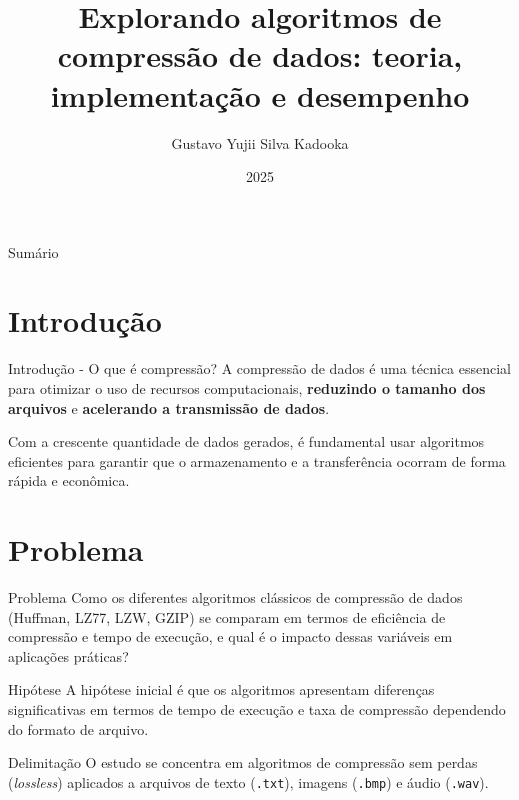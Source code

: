 \documentclass{beamer}
\title[Proposta de TCC]{Explorando algoritmos de compressão de dados: teoria, implementação e desempenho}
\author[Gustavo Kadooka]{Gustavo Yujii Silva Kadooka}
\institute[UNESP]{Universidade Estadual Paulista - Câmpus Bauru}
\date{2025}
\begin{document}
    \begin{frame}
        \titlepage  
    \end{frame}
    
    \begin{frame}{Sumário}
        \tableofcontents
    \end{frame}

    \section{Introdução}

    \begin{frame}{Introdução - O que é compressão?}
        A compressão de dados é uma técnica essencial para otimizar o uso de recursos computacionais, \textbf{reduzindo
            o tamanho dos arquivos} e \textbf{acelerando a transmissão de dados}. 

        Com a crescente quantidade de dados gerados, é fundamental usar algoritmos eficientes para garantir que o armazenamento e a transferência ocorram de forma rápida e econômica.
    \end{frame}

    \section{Problema}
    \begin{frame}{Problema} 
        Como os diferentes algoritmos clássicos de compressão de dados (Huffman, LZ77, LZW, GZIP) se comparam em termos de eficiência de compressão e tempo de execução, e qual é o impacto dessas variáveis em aplicações práticas?
        
        \begin{block}{Hipótese}
            A hipótese inicial é que os algoritmos apresentam diferenças significativas em termos de tempo de execução e
            taxa de compressão dependendo do formato de arquivo.
        \end{block}
        \begin{block}{Delimitação}
            O estudo se concentra em algoritmos de compressão sem perdas (\textit{lossless}) aplicados a arquivos de texto (\texttt{.txt}), imagens (\texttt{.bmp}) e áudio (\texttt{.wav}).
        \end{block}
    \end{frame}
\end{document}

